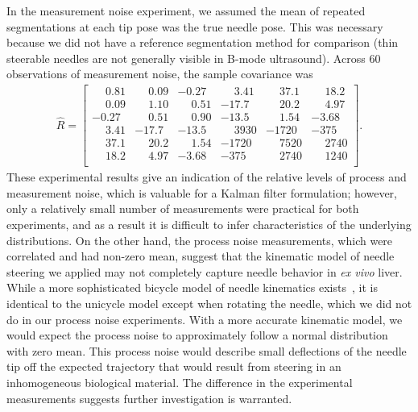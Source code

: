 In the measurement noise experiment, we assumed the mean of repeated segmentations at each tip pose was the true needle pose. This was necessary because we did not have a reference segmentation method for comparison (thin steerable needles are not generally visible in B-mode ultrasound). Across 60 observations of measurement noise, the sample covariance was
\begin{align*}
{\hat{R}} = \begin{bmatrix} 
\phantom{-}0.81 & \phantom{-}0.09 & -0.27 & \phantom{-}3.41 & \phantom{-}37.1 & \phantom{-}18.2\\ 
\phantom{-}0.09 & \phantom{-}1.10 & \phantom{-}0.51 & -17.7 & \phantom{-}20.2 & \phantom{-}4.97\\
-0.27 & \phantom{-}0.51 & \phantom{-}0.90 & -13.5 & \phantom{-}1.54 & -3.68\\
\phantom{-}3.41 & -17.7 & -13.5 & \phantom{-}3930 & -1720 & -375\\ 
\phantom{-}37.1 & \phantom{-}20.2 & \phantom{-}1.54 & -1720 & \phantom{-}7520 & \phantom{-}2740\\ 
\phantom{-}18.2 & \phantom{-}4.97 & -3.68 & -375 & \phantom{-}2740 & \phantom{-}1240\\
\end{bmatrix}.
\end{align*}
These experimental results give an indication of the relative levels of process and measurement noise, which is valuable for a Kalman filter formulation; however, only a relatively small number of measurements were practical for both experiments, and as a result it is difficult to infer characteristics of the underlying distributions. On the other hand, the process noise measurements, which were correlated and had non-zero mean, suggest that the kinematic model of needle steering we applied may not completely capture needle behavior in \textit{ex vivo} liver. While a more sophisticated bicycle model of needle kinematics exists~\cite{Webster2006}, it is identical to the unicycle model except when rotating the needle, which we did not do in our process noise experiments. With a more accurate kinematic model, we would expect the process noise to approximately follow a normal distribution with zero mean. This process noise would describe small deflections of the needle tip off the expected trajectory that would result from steering in an inhomogeneous biological material. The difference in the experimental measurements suggests further investigation is warranted.  

